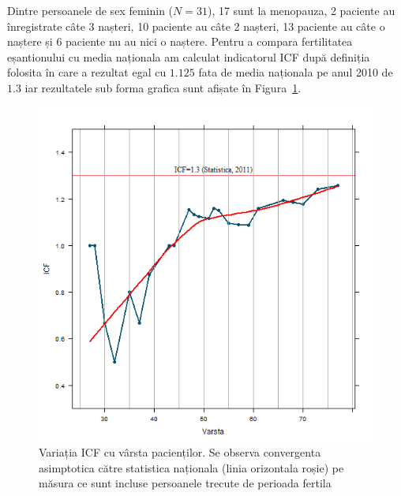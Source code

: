 \documentclass[12pt]{article}
\begin{document}
  Dintre persoanele de sex feminin ($N=31$), 17 sunt la menopauza, 2 paciente au înregistrate câte 3 nașteri, 10 paciente au câte 2 nașteri, 13 paciente au câte o naștere și 6 paciente nu au nici o naștere. Pentru a compara fertilitatea eșantionului cu media naționala am calculat indicatorul \ac{ICF} după definiția folosita în \citep{insee2011} care a rezultat egal cu $1.125$ fata de media naționala pe anul 2010 de $1.3$ iar rezultatele sub forma grafica sunt afișate în Figura~\ref{fig:incoNasteriICF}.
  \begin{figure}[H]
    \centering
    \includegraphics[width=0.8\linewidth]{incoNasteriICF}
    \caption{Variația ICF cu vârsta pacienților. Se observa convergenta asimptotica către statistica naționala (linia orizontala roșie) pe măsura ce sunt incluse persoanele trecute de perioada fertila }
    \label{fig:incoNasteriICF}
  \end{figure}
  
\end{document}
